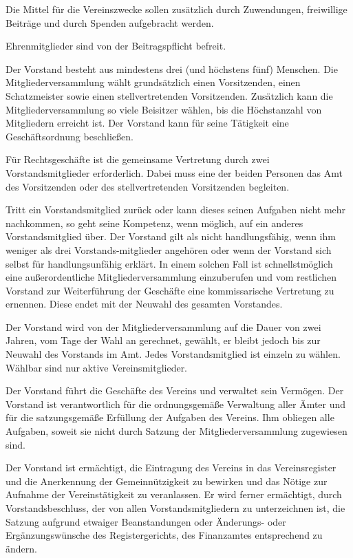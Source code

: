 \documentclass[parskip]{scrartcl}
\begin{document}
\begin{contract}
Die Mittel für die Vereinszwecke sollen zusätzlich durch Zuwendungen, freiwillige Beiträge und durch Spenden aufgebracht werden.

Ehrenmitglieder sind von der Beitragspflicht befreit.


Der Vorstand besteht aus mindestens drei (und höchstens fünf) Menschen. Die Mitgliederversammlung wählt grundsätzlich einen Vorsitzenden, einen Schatzmeister sowie einen stellvertretenden Vorsitzenden. Zusätzlich kann die Mitgliederversammlung so viele Beisitzer wählen, bis die Höchstanzahl von Mitgliedern erreicht ist. Der Vorstand kann für seine Tätigkeit eine Geschäftsordnung beschließen.

Für Rechtsgeschäfte ist die gemeinsame Vertretung durch zwei Vorstandsmitglieder erforderlich. Dabei muss eine der beiden Personen das Amt des Vorsitzenden oder des stellvertretenden Vorsitzenden begleiten.

Tritt ein Vorstandsmitglied zurück oder kann dieses seinen Aufgaben nicht mehr nachkommen, so geht seine Kompetenz, wenn möglich, auf ein anderes Vorstandsmitglied über. Der Vorstand gilt als nicht handlungsfähig, wenn ihm weniger als drei Vorstands-mitglieder angehören oder wenn der Vorstand sich selbst für handlungsunfähig erklärt. In einem solchen Fall ist schnellstmöglich eine außerordentliche Mitgliederversammlung einzuberufen und vom restlichen Vorstand zur Weiterführung der Geschäfte eine kommissarische Vertretung zu ernennen. Diese endet mit der Neuwahl des gesamten Vorstandes.


Der Vorstand wird von der Mitgliederversammlung auf die Dauer von zwei Jahren, vom Tage der Wahl an gerechnet, gewählt, er bleibt jedoch bis zur Neuwahl des Vorstands im Amt. Jedes Vorstandsmitglied ist einzeln zu wählen. Wählbar sind nur aktive Vereinsmitglieder.

Der Vorstand führt die Geschäfte des Vereins und verwaltet sein Vermögen. Der Vorstand ist verantwortlich für die ordnungsgemäße Verwaltung aller Ämter und für die satzungsgemäße Erfüllung der Aufgaben des Vereins. Ihm obliegen alle Aufgaben, soweit sie nicht durch Satzung der Mitgliederversammlung zugewiesen sind.

Der Vorstand ist ermächtigt, die Eintragung des Vereins in das Vereinsregister und die Anerkennung der Gemeinnützigkeit zu bewirken und das Nötige zur Aufnahme der Vereinstätigkeit zu veranlassen. Er wird ferner ermächtigt, durch Vorstandsbeschluss, der von allen Vorstandsmitgliedern zu unterzeichnen ist, die Satzung aufgrund etwaiger Beanstandungen oder Änderungs- oder Ergänzungswünsche des Registergerichts, des Finanzamtes entsprechend zu ändern.


\end{contract}
\end{document}
